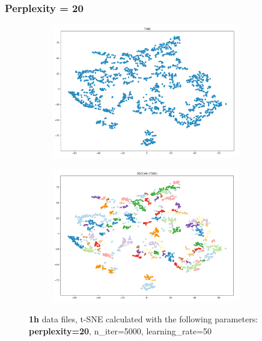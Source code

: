 \subsubsection{Perplexity = 20}
\begin{figure}[H]
  \centering
  \begin{subfigure}{.5\textwidth}
    \centering
    \includegraphics[width=0.9\textwidth]{./images/tsneParametersTest/perplexity/perp20-1hTSNE.png}
  \end{subfigure}%
  \begin{subfigure}{.5\textwidth}
    \centering
    \includegraphics[width=0.9\textwidth]{./images/tsneParametersTest/perplexity/perp20-1hDBSCAN.png}
  \end{subfigure}
	\caption{\textbf{1h} data files, t-SNE calculated with the following parameters: \textbf{perplexity=20}, n\_iter=5000, learning\_rate=50}
  \label{figure:1hperp20TSNE}
\end{figure}

